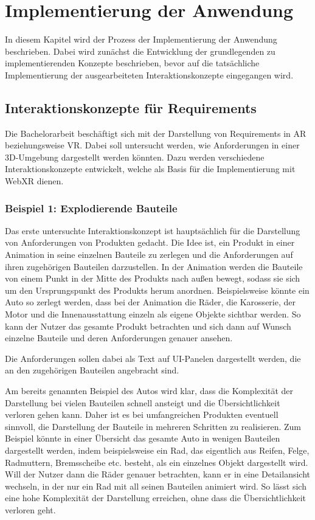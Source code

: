 \section{Implementierung der Anwendung}

In diesem Kapitel wird der Prozess der Implementierung der Anwendung beschrieben.
Dabei wird zunächst die Entwicklung der grundlegenden zu implementierenden Konzepte beschrieben, bevor auf die tatsächliche Implementierung der ausgearbeiteten Interaktionskonzepte eingegangen wird.

\subsection{Interaktionskonzepte für Requirements}

Die Bachelorarbeit beschäftigt sich mit der Darstellung von Requirements in AR beziehungsweise VR.
Dabei soll untersucht werden, wie Anforderungen in einer 3D-Umgebung dargestellt werden könnten.
Dazu werden verschiedene Interaktionskonzepte entwickelt, welche als Basis für die Implementierung mit WebXR dienen.


\subsubsection{Beispiel 1: Explodierende Bauteile}

Das erste untersuchte Interaktionskonzept ist hauptsächlich für die Darstellung von Anforderungen von Produkten gedacht.
Die Idee ist, ein Produkt in einer Animation in seine einzelnen Bauteile zu zerlegen und die Anforderungen auf ihren zugehörigen Bauteilen darzustellen.
In der Animation werden die Bauteile von einem Punkt in der Mitte des Produkts nach außen bewegt, sodass sie sich um den Ursprungspunkt des Produkts herum anordnen.
Beispielsweise könnte ein Auto so zerlegt werden, dass bei der Animation die Räder, die Karosserie, der Motor und die Innenausstattung einzeln als eigene Objekte sichtbar werden.
So kann der Nutzer das gesamte Produkt betrachten und sich dann auf Wunsch einzelne Bauteile und deren Anforderungen genauer ansehen.

Die Anforderungen sollen dabei als Text auf UI-Panelen dargestellt werden, die an den zugehörigen Bauteilen angebracht sind.

Am bereits genannten Beispiel des Autos wird klar, dass die Komplexität der Darstellung bei vielen Bauteilen schnell ansteigt und die Übersichtlichkeit verloren gehen kann.
Daher ist es bei umfangreichen Produkten eventuell sinnvoll, die Darstellung der Bauteile in mehreren Schritten zu realisieren.
Zum Beispiel könnte in einer Übersicht das gesamte Auto in wenigen Bauteilen dargestellt werden, indem beispielsweise ein Rad, das eigentlich aus Reifen, Felge, Radmuttern, Bremsscheibe etc. besteht, als ein einzelnes Objekt dargestellt wird.
Will der Nutzer dann die Räder genauer betrachten, kann er in eine Detailansicht wechseln, in der nur ein Rad mit all seinen Bauteilen animiert wird.
So lässt sich eine hohe Komplexität der Darstellung erreichen, ohne dass die Übersichtlichkeit verloren geht.


